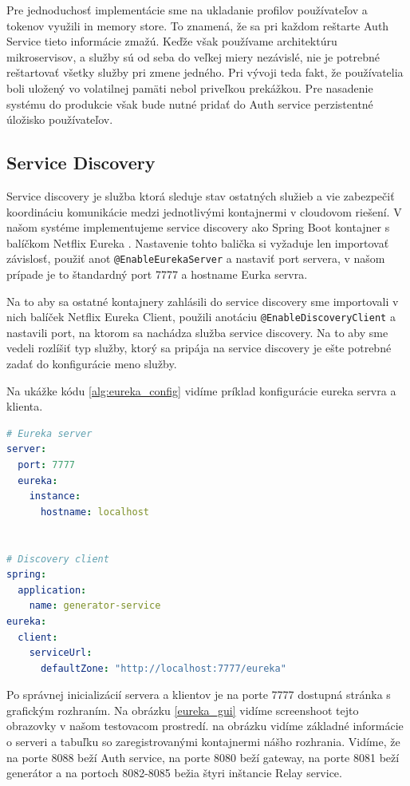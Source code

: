 Pre jednoduchosť implementácie sme na ukladanie profilov používateľov a tokenov využili in memory store. To znamená, že sa pri každom reštarte Auth Service tieto informácie zmažú. Keďže však používame architektúru mikroservisov, a služby sú od seba do veľkej miery nezávislé, nie je potrebné reštartovať všetky služby pri zmene jedného. Pri vývoji teda fakt, že používatelia boli uložený vo volatilnej pamäti nebol priveľkou prekážkou. Pre nasadenie systému do produkcie však bude nutné pridať do Auth service perzistentné úložisko používateľov.


\subsection{Service Discovery}
Service discovery je služba ktorá sleduje stav ostatných služieb a vie zabezpečiť koordináciu komunikácie medzi jednotlivými kontajnermi v cloudovom riešení. V našom systéme implementujeme service discovery ako Spring Boot kontajner s balíčkom Netflix Eureka \cite{eureka}. Nastavenie tohto balička si vyžaduje len importovať závislosť, použiť anot \texttt{@EnableEurekaServer} a nastaviť port servera, v našom prípade je to štandardný port 7777 a hostname Eurka servra.

Na to aby sa ostatné kontajnery zahlásili do service discovery sme importovali v nich balíček Netflix Eureka Client, použili anotáciu \texttt{@EnableDiscoveryClient} a nastavili port, na ktorom sa nachádza služba service discovery. Na to aby sme vedeli rozlíšiť typ služby, ktorý sa pripája na service discovery je ešte potrebné zadať do konfigurácie meno služby.

Na ukážke kódu \ref{alg:eureka_config} vidíme príklad konfigurácie eureka servra a klienta.

\begin{lstlisting}[float, caption={Konfigurácia Eureka servra a klienta},label={alg:eureka_config},language=yaml]
# Eureka server
server:
  port: 7777
  eureka:
	instance:
	  hostname: localhost
			

# Discovery client	
spring:
  application:
	name: generator-service
eureka:
  client:
	serviceUrl:
	  defaultZone: "http://localhost:7777/eureka"
\end{lstlisting}

Po správnej inicializácií servera a klientov je na porte 7777 dostupná stránka s grafickým rozhraním. Na obrázku \ref{eureka_gui} vidíme screenshoot tejto obrazovky v našom testovacom prostredí. na obrázku vidíme základné informácie o serveri a tabuľku so zaregistrovanými kontajnermi nášho rozhrania. Vidíme, že na porte 8088 beží Auth service, na porte 8080 beží gateway, na porte 8081 beží generátor a na portoch 8082-8085 bežia štyri inštancie Relay service.

